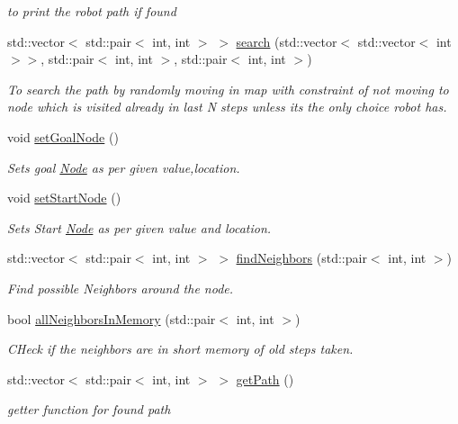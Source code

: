 \begin{DoxyCompactItemize}
\begin{DoxyCompactList}\small\item\em to print the robot path if found \end{DoxyCompactList}\item 
std\+::vector$<$ std\+::pair$<$ int, int $>$ $>$ \hyperlink{classRandomPlanner_a8c8eed29ca324e01b4659a3c99b4e14d}{search} (std\+::vector$<$ std\+::vector$<$ int $>$$>$, std\+::pair$<$ int, int $>$, std\+::pair$<$ int, int $>$)
\begin{DoxyCompactList}\small\item\em To search the path by randomly moving in map with constraint of not moving to node which is visited already in last N steps unless its the only choice robot has. \end{DoxyCompactList}\item 
void \hyperlink{classRandomPlanner_a85e06fe4a9140bd8114161e7c42a9b7d}{set\+Goal\+Node} ()
\begin{DoxyCompactList}\small\item\em Sets goal \hyperlink{structNode}{Node} as per given value,location. \end{DoxyCompactList}\item 
void \hyperlink{classRandomPlanner_afb341442e9b2629873f6e8c220ea2846}{set\+Start\+Node} ()
\begin{DoxyCompactList}\small\item\em Sets Start \hyperlink{structNode}{Node} as per given value and location. \end{DoxyCompactList}\item 
std\+::vector$<$ std\+::pair$<$ int, int $>$ $>$ \hyperlink{classRandomPlanner_a33348010a426948b7f849bff67439e4e}{find\+Neighbors} (std\+::pair$<$ int, int $>$)
\begin{DoxyCompactList}\small\item\em Find possible Neighbors around the node. \end{DoxyCompactList}\item 
bool \hyperlink{classRandomPlanner_a529a590b4b69c8a25e26502251f4d244}{all\+Neighbors\+In\+Memory} (std\+::pair$<$ int, int $>$)
\begin{DoxyCompactList}\small\item\em C\+Heck if the neighbors are in short memory of old steps taken. \end{DoxyCompactList}\item 
std\+::vector$<$ std\+::pair$<$ int, int $>$ $>$ \hyperlink{classRandomPlanner_aa743dd84e235919e8dd6c63c5c7eb1e8}{get\+Path} ()
\begin{DoxyCompactList}\small\item\em getter function for found path \end{DoxyCompactList}\end{DoxyCompactItemize}


